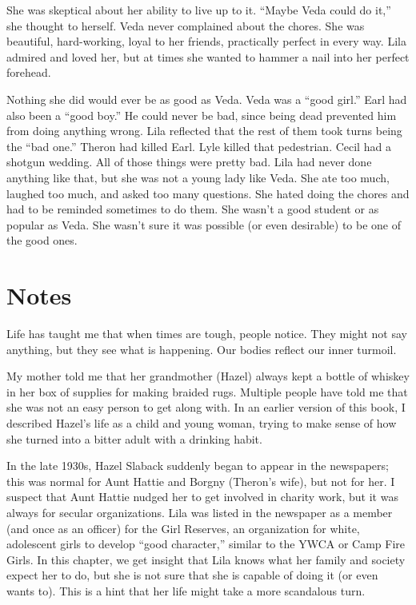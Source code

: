 \documentclass[
  american,
  letterpaper,
]{book}
\begin{document}
She was skeptical about her ability to live up to it. ``Maybe Veda could
do it,'' she thought to herself. Veda never complained about the chores.
She was beautiful, hard-working, loyal to her friends, practically
perfect in every way. Lila admired and loved her, but at times she
wanted to hammer a nail into her perfect forehead.

Nothing she did would ever be as good as Veda. Veda was a ``good girl.''
Earl had also been a ``good boy.'' He could never be bad, since being
dead prevented him from doing anything wrong. Lila reflected that the
rest of them took turns being the ``bad one.'' Theron had killed Earl.
Lyle killed that pedestrian. Cecil had a shotgun wedding. All of those
things were pretty bad. Lila had never done anything like that, but she
was not a young lady like Veda. She ate too much, laughed too much, and
asked too many questions. She hated doing the chores and had to be
reminded sometimes to do them. She wasn't a good student or as popular
as Veda. She wasn't sure it was possible (or even desirable) to be one
of the good ones.

\section{Notes}\label{notes-18}

Life has taught me that when times are tough, people notice. They might
not say anything, but they see what is happening. Our bodies reflect our
inner turmoil.

My mother told me that her grandmother (Hazel) always kept a bottle of
whiskey in her box of supplies for making braided rugs. Multiple people
have told me that she was not an easy person to get along with. In an
earlier version of this book, I described Hazel's life as a child and
young woman, trying to make sense of how she turned into a bitter adult
with a drinking habit.

In the late 1930s, Hazel Slaback suddenly began to appear in the
newspapers; this was normal for Aunt Hattie and Borgny (Theron's wife),
but not for her. I suspect that Aunt Hattie nudged her to get involved
in charity work, but it was always for secular organizations. Lila was
listed in the newspaper as a member (and once as an officer) for the
Girl Reserves, an organization for white, adolescent girls to develop
``good character,'' similar to the YWCA or Camp Fire Girls. In this
chapter, we get insight that Lila knows what her family and society
expect her to do, but she is not sure that she is capable of doing it
(or even wants to). This is a hint that her life might take a more
scandalous turn.
\end{document}
